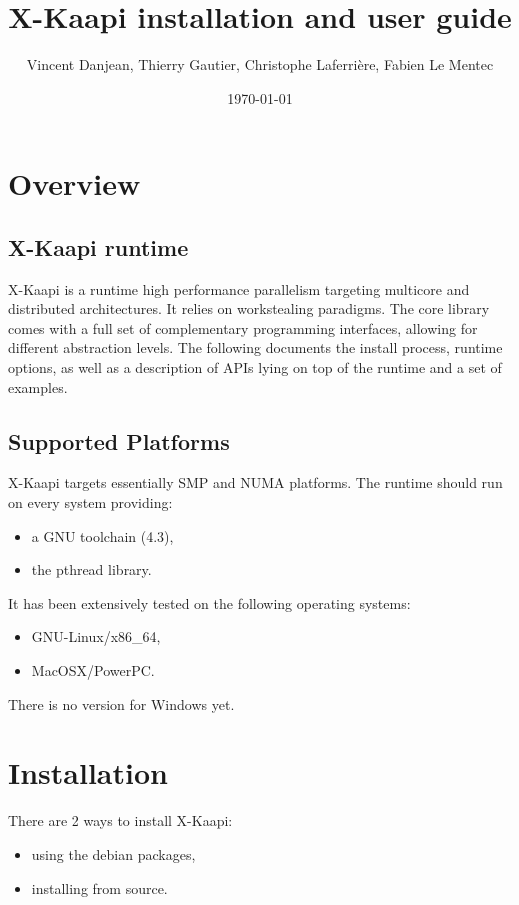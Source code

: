 \documentclass{article}
\newcommand{\kaapi}{\textsc{X}-Kaapi\xspace}
\begin{document}
\title{\kaapi installation and user guide}
\author{Vincent Danjean, Thierry Gautier, Christophe Laferrière, Fabien Le Mentec}
\date{\today}
\maketitle
\tableofcontents
\newpage

\section{Overview}

\subsection{\kaapi runtime}
\kaapi is a runtime high performance parallelism targeting multicore and
distributed architectures.
It relies on workstealing paradigms.
The core library comes with a full set of complementary programming interfaces,
allowing for different abstraction levels.
The following documents the install process, runtime options, as well as a
description of APIs lying on top of the runtime and a set of examples.

\subsection{Supported Platforms}
\kaapi targets essentially SMP and NUMA platforms. The runtime should run
on every system providing:
\begin{itemize}
\item a GNU toolchain (4.3),
\item the pthread library.
\end{itemize}
It has been extensively tested on the following operating systems:
\begin{itemize}
\item GNU-Linux/x86\_64,
\item MacOSX/PowerPC.
\end{itemize}
There is no version for Windows yet.

\section{Installation}

There are 2 ways to install \kaapi:
\begin{itemize}
\item using the debian packages,
\item installing from source.
\end{itemize}
\end{document}
